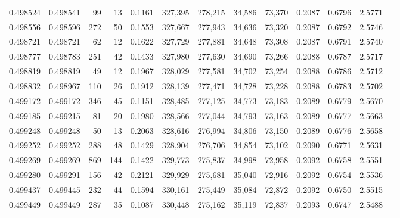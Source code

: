 \begin{tabular}{rrrrrrrrrrrrr}
0.498524 & 0.498541 &    99 &    13 &                                     0.1161 & 327,395 & 278,215 &  34,586 &  73,370 & 0.2087 & 0.6796 & 2.5771 \\
0.498556 & 0.498596 &   272 &    50 &                                     0.1553 & 327,667 & 277,943 &  34,636 &  73,320 & 0.2087 & 0.6792 & 2.5746 \\
0.498721 & 0.498721 &    62 &    12 &                                     0.1622 & 327,729 & 277,881 &  34,648 &  73,308 & 0.2087 & 0.6791 & 2.5740 \\
0.498777 & 0.498783 &   251 &    42 &                                     0.1433 & 327,980 & 277,630 &  34,690 &  73,266 & 0.2088 & 0.6787 & 2.5717 \\
0.498819 & 0.498819 &    49 &    12 &                                     0.1967 & 328,029 & 277,581 &  34,702 &  73,254 & 0.2088 & 0.6786 & 2.5712 \\
0.498832 & 0.498967 &   110 &    26 &                                     0.1912 & 328,139 & 277,471 &  34,728 &  73,228 & 0.2088 & 0.6783 & 2.5702 \\
0.499172 & 0.499172 &   346 &    45 &                                     0.1151 & 328,485 & 277,125 &  34,773 &  73,183 & 0.2089 & 0.6779 & 2.5670 \\
0.499185 & 0.499215 &    81 &    20 &                                     0.1980 & 328,566 & 277,044 &  34,793 &  73,163 & 0.2089 & 0.6777 & 2.5663 \\
0.499248 & 0.499248 &    50 &    13 &                                     0.2063 & 328,616 & 276,994 &  34,806 &  73,150 & 0.2089 & 0.6776 & 2.5658 \\
0.499252 & 0.499252 &   288 &    48 &                                     0.1429 & 328,904 & 276,706 &  34,854 &  73,102 & 0.2090 & 0.6771 & 2.5631 \\
0.499269 & 0.499269 &   869 &   144 &                                     0.1422 & 329,773 & 275,837 &  34,998 &  72,958 & 0.2092 & 0.6758 & 2.5551 \\
0.499280 & 0.499291 &   156 &    42 &                                     0.2121 & 329,929 & 275,681 &  35,040 &  72,916 & 0.2092 & 0.6754 & 2.5536 \\
0.499437 & 0.499445 &   232 &    44 &                                     0.1594 & 330,161 & 275,449 &  35,084 &  72,872 & 0.2092 & 0.6750 & 2.5515 \\
0.499449 & 0.499449 &   287 &    35 &                                     0.1087 & 330,448 & 275,162 &  35,119 &  72,837 & 0.2093 & 0.6747 & 2.5488 \\

\end{tabular}

